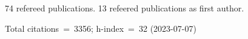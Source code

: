 74 refereed publications. 13 refeered publications as first author.

Total citations~=~3356; h-index~=~32 (2023-07-07)